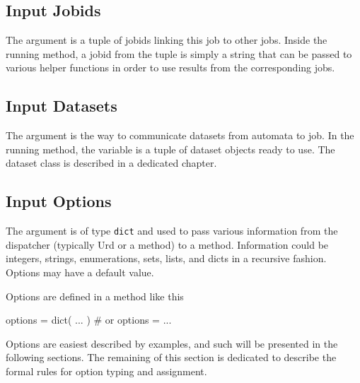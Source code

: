 \subsection{Input Jobids}
The \jobids argument is a tuple of jobids linking this job to other
jobs.  Inside the running method, a jobid from the \jobids tuple is
simply a string that can be passed to various helper functions in
order to use results from the corresponding jobs.



\subsection{Input Datasets}
The \datasets argument is the way to communicate datasets from
automata to job.  In the running method, the \datasets variable is a
tuple of dataset objects ready to use.  The dataset class is described
in a dedicated chapter.




\subsection{Input Options}

The \options argument is of type \texttt{dict} and used to pass
various information from the dispatcher (typically Urd or a method) to
a method.  Information could be integers, strings, enumerations, sets,
lists, and dicts in a recursive fashion.  Options may have a default
value.

Options are defined in a method like this
\begin{python}
  options = dict( ... )  # or
  options = { ... }
\end{python}

Options are easiest described by examples, and such will be presented
in the following sections.  The remaining of this section is dedicated
to describe the formal rules for option typing and assignment.

